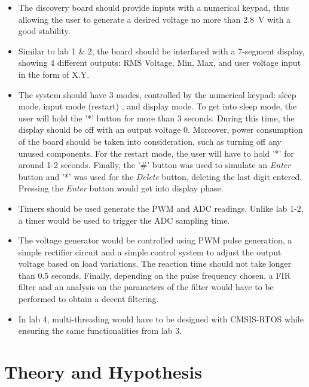 \documentclass[a4paper,titlepage]{article}
\begin{document}
\begin{itemize}
\item The discovery board should provide inputs with a numerical keypad, thus allowing the user to generate a desired voltage no more than \SI{2.8}{\volt} with a good stability.

\item Similar to lab 1 \& 2, the board should be interfaced with a 7-segment display, showing 4 different outputs: RMS Voltage, Min, Max, and user voltage input in the form of X.Y.

\item The system should have 3 modes, controlled by the numerical keypad: sleep mode, input mode (restart) , and display mode. To get into sleep mode, the user will hold the '*' button for more than 3 seconds. During this time, the display should be off with an output voltage 0. Moreover, power consumption of the board should be taken into consideration, such as turning off any unused components. For the restart mode,  the user will have to hold '*' for around 1-2 seconds. Finally, the '\#' button was used to simulate an \textit{Enter} button and '*' was used for the \textit{Delete} button, deleting the last digit entered. Pressing the \textit{Enter} button would get into display phase.

\item Timers should be used generate the PWM and ADC readings. Unlike lab 1-2, a timer would be used to trigger the ADC sampling time.

\item The voltage generator would be controlled using PWM pulse generation, a simple rectifier circuit and a simple control system to adjust the output voltage based on load variations. The reaction time should not take longer than 0.5 seconds. Finally, depending on the pulse frequency chosen, a FIR filter and an analysis on the parameters of the filter would have to be performed to obtain a decent filtering.

\item In lab 4, multi-threading would have to be designed with CMSIS-RTOS while ensuring the same functionalities from lab 3.

\end{itemize}

\section{Theory and Hypothesis}
\end{document}
